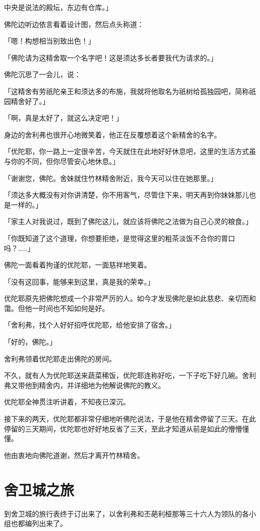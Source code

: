 \documentclass[twoside,openany]{book}
\begin{document}
中央是说法的殿坛，东边有仓库。」

佛陀边听边依言看着设计图，然后点头称道：

「嗯！构想相当别致出色！」

「佛陀请为这精舍取一个名字吧！这是须达多长者要我代为请求的。」

佛陀沉思了一会儿，说：

「这精舍有劳祇陀亲王和须达多的布施，我就将他取名为祇树给孤独园吧，简称祇园精舍好了。」

「啊，真是太好了，就这么决定吧！」

身边的舍利弗也很开心地微笑着，他正在反覆想着这个新精舍的名字。

「优陀耶，你一路上一定很辛苦，今天就住在此地好好休息吧，这里的生活方式虽与你的不同，但你尽管安心地休息。」

「谢谢您，佛陀。舍妹就住竹林精舍附近，我今天可以住在她那里。」

「须达多大概没有对你讲清楚，你不用客气，尽管住下来，明天再到你妹妹那儿也是一样的。」

「家主人对我说过，既到了佛陀这儿，就应该将佛陀之法做为自己心灵的粮食。」

「你既知道了这个道理，你想要拒绝，是觉得这里的粗茶淡饭不合你的胃口吗？……」

佛陀一面看着拘谨的优陀耶，一面慈祥地笑着。

「没有这回事，能够来到这里，真是我的荣幸。」

优陀耶原先把佛陀想成一个非常严厉的人。如今才发现佛陀是如此慈悲、亲切而和霭。但他一时间也不知如何是好。

「舍利弗，找个人好好招呼优陀耶，给他安排了宿舍。」

「好的，佛陀。」

舍利弗领着优陀耶走出佛陀的房间。

不久，就有人为优陀耶送来蔬菜稀饭，优陀耶连称好吃，一下子吃下好几碗。舍利弗又带他到精舍内，并详细地为他解说佛陀的教义。

优陀耶全神贯注听讲着，不知夜已深沉。

接下来的两天，优陀耶都非常仔细地听佛陀说法，于是他在精舍停留了三天。在此停留的三天期间，优陀耶也好好地反省了三天，至此才知道从前是如此的懵懵懂懂。

他由衷地向佛陀道谢，然后才离开竹林精舍。

\section{舍卫城之旅}\label{sec6.4}

到舍卫城的旅行表终于订出来了，以舍利弗和丕葩利桠那等三十六人为领队的各小组也都编列出来了。
\end{document}
